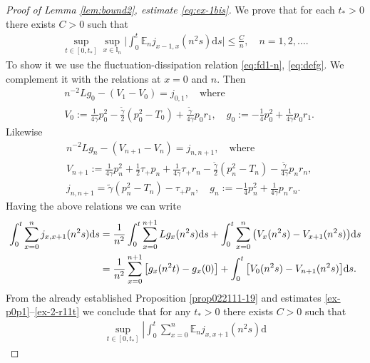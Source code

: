 \documentclass[EJP]{ejpecp} %
\newcommand\bbE{{\mathbb E}}
\newcommand\T{{\mathbb I}}
\newcommand \ga{\gamma}
\renewcommand{\le}{\leqslant}
\newcommand{\dd  }{\mathrm{d}}
\renewcommand{\tilde}{\widetilde}
\numberwithin{equation}{section}
\begin{document}
\begin{proof}[Proof of Lemma \ref{lem:bound2}, estimate \eqref{eq:ex-1bis}]

 We prove that for each $t_*>0$ there exists $C>0$ such that
   \begin{align}
   \label{eq:7b}
\sup_{t\in[0,t_*]}\sup_{x\in \T_n}\bigg|\int_0^t\bbE_n j_{x-1,x}(n^2s)\dd s\bigg|\le \frac{C}{n},\quad n=1,2,\ldots.
 \end{align}
To show it we use the fluctuation-dissipation relation
\eqref{eq:fd1-n}, \eqref{eq:defg}. We complement it with the relations
at $x=0$ and $n$. Then
\begin{equation*}
  \begin{split}
   & n^{-2} L g_0 - (V_{1}-V_0)= j_{0,1},\quad\mbox{where}\\
   &V_0:=\frac 1{4 \gamma}
   p_0^2-
   \frac{\tilde\ga}{2}(p_0^2 -T_0)+\frac{\tilde\ga}{4\ga}p_0r_1,\quad g_0:=-\frac14p_0^2 + \frac{1}{4\gamma}p_0r_{1} .
\end{split}
\end{equation*}
Likewise
\begin{equation*}
  \begin{split}
   & n^{-2} L g_n - (V_{n+1}-V_n)= j_{n,n+1},\quad\mbox{where}\\
   &V_{n+1}:=\frac 1{4 \gamma}
   p_n^2+\frac12\tau_+ p_n+\frac1{4\ga}\tau_+ r_n
   -\frac{\tilde\ga}{2}(p_n^2 -T_n)-\frac{\tilde\ga}{4\ga} p_nr_n,\\
   &
   j_{n,n+1}=\tilde\ga(p_n^2-T_n)-\tau_+p_n,\quad g_n:=-\frac14p_n^2 + \frac{1}{4\gamma}p_nr_{n} .
\end{split}
\end{equation*}
Having the above relations we can write
\begin{align}
  \label{eq:7b}
\int_0^t\sum_{x=0}^{n}j_{x,x+1}(n^2 s)\dd
                  s&=\frac{1}{n^2}\int_0^t\sum_{x=0}^{n+1}Lg_{x}(n^2
                  s)\dd s+\int_0^t\sum_{x=0}^{n}\big(V_{x}(n^2
                  s)-V_{x+1}(n^2 s)\big)\dd s\notag\\
  &
    =\frac{1}{n^2}\sum_{x=0}^{n+1}\big[g_{x}(n^2
                  t)-g_{x}(0
                  )\big]+\int_0^t \big[V_{0}(n^2
                  s)-V_{n+1}(n^2 s)\big] \dd s.
\end{align}
From the already established Proposition \ref{prop022111-19} and
estimates \eqref{ex-p0p1}--\eqref{ex-2-r11t} we conclude that
for any $t_*>0$ there exists $C>0$ such that
\begin{align}
\label{031211-19}
\sup_{t\in[0,t_*]}\left|\int_0^t\sum_{x=0}^{n}\bbE_nj_{x,x+1}(n^2 s)\dd

\end{align}
\end{proof}
\end{document}
